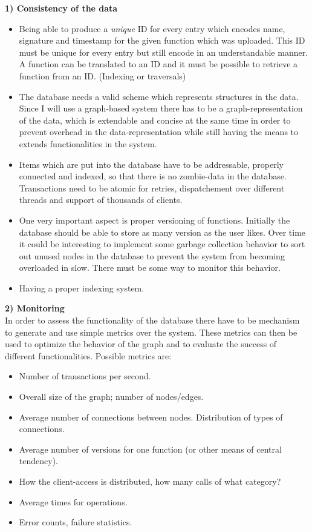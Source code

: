 \documentclass[11p]{scrartcl}
\begin{document}
\textbf{1) Consistency of the data}
\begin{itemize}
	\item Being able to produce a \emph{unique} ID for every entry which encodes name, signature and timestamp for the given function which was uploaded. This ID must be unique for every entry but still encode in an understandable manner. A function can be translated to an ID and it must be possible to retrieve a function from an ID. (Indexing or traversals) 
	\item The database needs a valid scheme which represents structures in the data. Since I will use a graph-based system there has to be a graph-representation of the data, which is extendable and concise at the same time in order to prevent overhead in the data-representation while still having the means to extends functionalities in the system.
	\item Items which are put into the database have to be addressable, properly connected and indexed, so that there is no zombie-data in the database. Transactions need to be atomic for retries, dispatchement over different threads and support of thousands of clients. 
	\item One very important aspect is proper versioning of functions. Initially the database should be able to store as many version as the user likes. Over time it could be interesting to implement some garbage collection behavior to sort out unused nodes in the database to prevent the system from becoming overloaded in slow. There must be some way to monitor this behavior.
	\item Having a proper indexing system.
\end{itemize}

\textbf{2) Monitoring}\\
In order to assess the functionality of the database there have to be mechanism to generate and use simple metrics over the system. These metrics can then be used to optimize the behavior of the graph and to evaluate the success of different functionalities. Possible metrics are:
\begin{itemize}
	\item Number of transactions per second.
	\item Overall size of the graph; number of nodes/edges.
	\item Average number of connections between nodes. Distribution of types of connections.
	\item Average number of versions for one function (or other means of central tendency).
	\item How the client-access is distributed, how many calls of what category?
	\item Average times for operations.
	\item Error counts, failure statistics.
\end{itemize}
\end{document}
